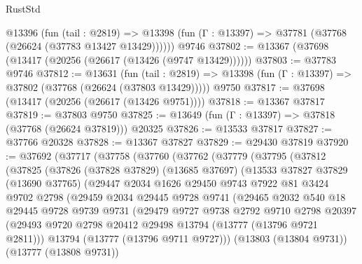 \begin{lexlean}{RustStd}
\begin{coremodule}
    @13396
      (fun (tail : @2819) =>
      @13398 (fun (Γ : @13397) => @37781 (@37768 (@26624 (@37783 @13427 @13429))))))
    @9746
@37802 := @13367 (@37698 (@13417 (@20256 (@26617 (@13426 (@9747 @13429))))))
@37803 := @37783 @9746
@37812 := @13631
    (fun (tail : @2819) => @13398 (fun (Γ : @13397) => @37802 (@37768 (@26624 (@37803 @13429)))))
    @9750
@37817 := @37698 (@13417 (@20256 (@26617 (@13426 @9751))))
@37818 := @13367 @37817
@37819 := @37803 @9750
@37825 := @13649 (fun (Γ : @13397) => @37818 (@37768 (@26624 @37819))) @20325
@37826 := @13533 @37817
@37827 := @37766 @20328
@37828 := @13367 @37827
@37829 := @29430 @37819
@37920 := @37692
    (@37717
      (@37758
        (@37760
          (@37762
            (@37779
              (@37795
                (@37812
                  (@37825
                    (@37826
                      (@37828 @37829)
                      (@13685 @37697)
                      (@13533
                        @37827
                        @37829
                        (@13690 @37765)
                        (@29447
                          @2034
                          @1626
                          @29450
                          @9743
                          @7922
                          @81
                          @3424
                          @9702
                          @2798
                          (@29459
                            @2034
                            @29445
                            @9728
                            @9741
                            (@29465
                              @2032
                              @540
                              @18
                              @29445
                              @9728
                              @9739
                              @9731
                              (@29479
                                @9727
                                @9738
                                @2792
                                @9710
                                @2798
                                @20397
                                (@29493
                                  @9720
                                  @2798
                                  @20412
                                  @29498
                                  @13794
                                  (@13777 (@13796 @9721 @2811)))
                                @13794
                                (@13777 (@13796 @9711 @9727)))
                              (@13803 (@13804 @9731))
                              (@13777 (@13808 @9731))

\end{coremodule}
\end{lexlean}
